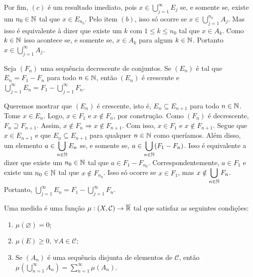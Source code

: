 \begin{prova}
    Por fim, $(c)$ é um resultado imediato, pois $ x \in \displaystyle \bigcup_{j = 1}^\infty E_j$ se, e somente se, 
    existe um $n_0 \in \operatorname{\mathbb{N}}$ tal que $x \in E_{n_0}$. 
    Pelo item $(b)$, isso só ocorre se $x \in \displaystyle \bigcup_{j = 1}^{n_0}A_j$.
    Mas isso é equivalente à dizer que existe um $k$ com $1\leq k\leq n_0$ tal que $x \in A_k$.
    Como $k \in \operatorname{\mathbb{N}}$ isso acontece se, e somente se, $x \in A_k$ para algum $k \in \operatorname{\mathbb{N}}$.
    Portanto $x \in \displaystyle \bigcup_{j = 1}^\infty A_j$.
\end{prova}

\begin{proposition}
\label{prop:sequencia-decrescente-conjuntos-resultado-A_n}
Seja $(F_n)$ uma sequência decrescente de conjuntos. 
Se $(E_n)$ é tal que $E_n = F_1 - F_n$ para todo $n \in \operatorname{\mathbb{N}}$, então $(E_n)$ é crescente e 
$\displaystyle \bigcup_{j = 1}^\infty E_n = \displaystyle F_1 - \bigcup_{j = 1}^\infty F_n$.
\end{proposition}

\begin{prova}
    Queremos mostrar que $(E_n)$ é crescente, isto é, $E_n \subseteq E_{n+1}$ para todo $n \in \operatorname{\mathbb{N}}$.
    Tome $x \in E_n$. Logo, $x \in F_1$ e $x \notin F_n$, por construção.
    Como $(F_n)$ é decrescente, $F_{n} \supseteq F_{n+1}$. 
    Assim, $x \notin F_n \Rightarrow x \notin F_{n+1}$.
    Com isso, $x \in F_1$ e $x \notin F_{n+1}$.
    Segue que $x \in E_{n+1}$ e que $E_n \subseteq E_{n+1}$ para qualquer $n \in \operatorname{\mathbb{N}}$ como queríamos.
    Além disso, um elemento $a \in \displaystyle \bigcup_{n \in \operatorname{\mathbb{N}}} E_n$ se, e somente se,
    $a \in \displaystyle \bigcup_{n \in \operatorname{\mathbb{N}}} (F_1 - F_n)$.
    Isso é equivalente a dizer que existe um $n_0 \in \operatorname{\mathbb{N}}$ tal que $a \in F_1 - F_{n_0}$.
    Correspondentemente, $ a \in F_1$ e existe um $n_0 \in \operatorname{\mathbb{N}}$ tal que $x \notin F_{n_0}$.
    Isso só ocorre se $x \in F_1$, mas $x \notin \displaystyle \bigcup_{n \in \operatorname{\mathbb{N}}} F_n$.
    Portanto, $\displaystyle \bigcup_{j = 1}^\infty E_n = \displaystyle F_1 - \bigcup_{j = 1}^\infty F_n$.
\end{prova}

\begin{definition}
\label{def:medida}
    Uma medida é uma função $\mu: (X, \mathcal{C}) \to \operatorname{\overline{\mathbb{R}}}$ tal que satisfaz as seguintes condições:
    \begin{enumerate}[label* = (\roman*)]
        \item $\mu(\varnothing) = 0$;
        \item $\mu(E) \geq 0, \ \forall A \in \mathcal{C}$;
        \item Se $(A_n)$ é uma sequência disjunta de elementos de  $\mathcal{C}$, então 
        $\displaystyle\mu\left(\bigcup_{n = 1}^\infty A_n\right) = \sum_{n = 1}^\infty\mu(A_n)$.
        
    \end{enumerate}
\end{definition}

